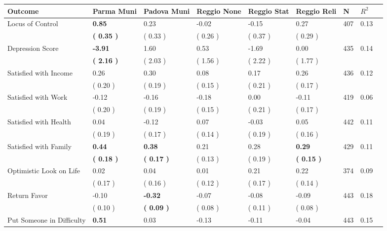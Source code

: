 \begin{tabular}{L{6.2cm} C{1.8cm} C{1.8cm} C{1.8cm} C{1.8cm} C{1.8cm} C{1.8cm} C{0.3cm} C{0.3cm}}
\toprule
 \textbf{Outcome} & \textbf{Parma Muni} & \textbf{Padova Muni} & \textbf{Reggio None} & \textbf{Reggio Stat} & \textbf{Reggio Reli} & \textbf{N} & \textbf{$ R^2$} \\
\midrule
Locus of Control & \textbf{     0.85} &      0.23 &     -0.02 &     -0.15 &      0.27  & 407 &       0.13 \\ 
 & \textbf{(     0.35 )} & (     0.33 ) & (     0.26 ) & (     0.37 ) & (     0.29 )  & \\
Depression Score & \textbf{    -3.91} &      1.60 &      0.53 &     -1.69 &      0.00  & 435 &       0.14 \\ 
 & \textbf{(     2.16 )} & (     2.03 ) & (     1.56 ) & (     2.22 ) & (     1.77 )  & \\
Satisfied with Income &      0.26 &      0.30 &      0.08 &      0.17 &      0.26  & 436 &       0.12 \\ 
 & (     0.20 ) & (     0.19 ) & (     0.15 ) & (     0.21 ) & (     0.17 )  & \\
Satisfied with Work &     -0.12 &     -0.16 &     -0.18 &      0.00 &     -0.11  & 419 &       0.06 \\ 
 & (     0.20 ) & (     0.19 ) & (     0.15 ) & (     0.21 ) & (     0.17 )  & \\
Satisfied with Health &      0.04 &     -0.12 &      0.07 &     -0.03 &      0.05  & 442 &       0.11 \\ 
 & (     0.19 ) & (     0.17 ) & (     0.14 ) & (     0.19 ) & (     0.16 )  & \\
Satisfied with Family & \textbf{     0.44} & \textbf{     0.38} &      0.21 &      0.28 & \textbf{     0.29}  & 429 &       0.11 \\ 
 & \textbf{(     0.18 )} & \textbf{(     0.17 )} & (     0.13 ) & (     0.19 ) & \textbf{(     0.15 )}  & \\
Optimistic Look on Life &      0.02 &      0.04 &      0.01 &      0.21 &      0.22  & 374 &       0.09 \\ 
 & (     0.17 ) & (     0.16 ) & (     0.12 ) & (     0.17 ) & (     0.14 )  & \\
Return Favor &     -0.10 & \textbf{    -0.32} &     -0.07 &     -0.08 &     -0.09  & 443 &       0.18 \\ 
 & (     0.10 ) & \textbf{(     0.09 )} & (     0.08 ) & (     0.11 ) & (     0.08 )  & \\
Put Someone in Difficulty & \textbf{     0.51} &      0.03 &     -0.13 &     -0.11 &     -0.04  & 443 &       0.15 \\ 

\end{tabular}
